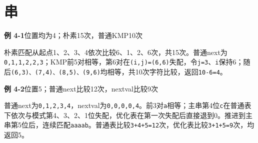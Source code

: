 \documentclass{sidenotes-simplex}
\begin{document}
\Needspace{48.00mm}\section*{串}
\par\medskip\Needspace{30.00mm}\noindent{}\label{a:DS04-E01}\textbf{例 4-1}\quad 位置均为4；朴素15次，普通KMP10次
\par\smallskip
朴素匹配从起点1、2、3、4依次比较6、1、2、6次，共15次。普通next为\texttt{0,1,1,2,2,3}；KMP前5对相等，第6对在\texttt{(i,j)=(6,6)}失配，令\texttt{j=3}、\texttt{i}保持6；随后\texttt{(6,3)、(7,4)、(8,5)、(9,6)}均相等，共10次字符比较，返回\texttt{10-6=4}。

\par\medskip\Needspace{30.00mm}\noindent{}\label{a:DS04-E02}\textbf{例 4-2}\quad 位置5；普通next比较12次，nextval比较9次
\par\smallskip
普通next为\texttt{0,1,2,3,4}，nextval为\texttt{0,0,0,0,4}。前3对\texttt{a}相等；主串第4位\texttt{c}在普通表下依次与模式第4、3、2、1位失配，优化表在第一次失配后直接退到0。推进到主串第5位后，连续匹配\texttt{aaaab}。普通表比较\texttt{3+4+5=12}次，优化表比较\texttt{3+1+5=9}次，均返回5。
\end{document}
